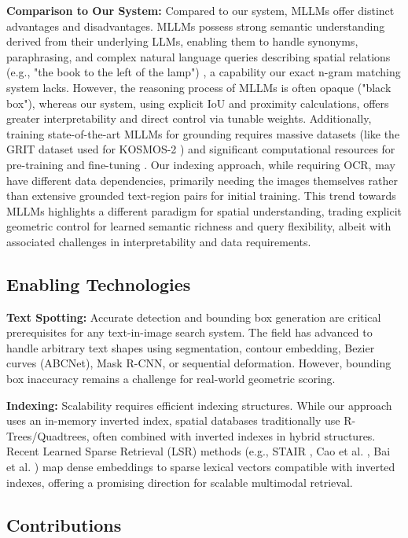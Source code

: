 \documentclass[manuscript,screen]{acmart}
\begin{document}
\textbf{Comparison to Our System:} Compared to our system, MLLMs offer distinct advantages and disadvantages. MLLMs possess strong semantic understanding derived from their underlying LLMs, enabling them to handle synonyms, paraphrasing, and complex natural language queries describing spatial relations (e.g., "the book to the left of the lamp") \cite{Huang24, Yin24}, a capability our exact n-gram matching system lacks. However, the reasoning process of MLLMs is often opaque ("black box"), whereas our system, using explicit IoU and proximity calculations, offers greater interpretability and direct control via tunable weights. Additionally, training state-of-the-art MLLMs for grounding requires massive datasets (like the GRIT dataset used for KOSMOS-2 \cite{Huang24}) and significant computational resources for pre-training and fine-tuning \cite{Yin24}. Our indexing approach, while requiring OCR, may have different data dependencies, primarily needing the images themselves rather than extensive grounded text-region pairs for initial training. This trend towards MLLMs highlights a different paradigm for spatial understanding, trading explicit geometric control for learned semantic richness and query flexibility, albeit with associated challenges in interpretability and data requirements.

\subsection{Enabling Technologies}

\textbf{Text Spotting:} Accurate detection and bounding box generation are critical prerequisites for any text-in-image search system. The field has advanced to handle arbitrary text shapes using segmentation, contour embedding, Bezier curves (ABCNet), Mask R-CNN, or sequential deformation. However, bounding box inaccuracy remains a challenge for real-world geometric scoring.

\textbf{Indexing:} Scalability requires efficient indexing structures. While our approach uses an in-memory inverted index, spatial databases traditionally use R-Trees/Quadtrees, often combined with inverted indexes in hybrid structures. Recent Learned Sparse Retrieval (LSR) methods (e.g., STAIR \cite{Chen23}, Cao et al. \cite{Cao23}, Bai et al. \cite{Bai24}) map dense embeddings to sparse lexical vectors compatible with inverted indexes, offering a promising direction for scalable multimodal retrieval.

\subsection{Contributions}
\end{document}
